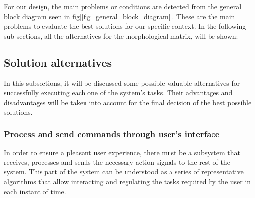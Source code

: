\documentclass[11pt]{report} %
\begin{document}
For our design, the main problems or conditions are detected from the general block diagram seen in fig[\ref{fig_general_block_diagram}]. These are the main problems to evaluate the best solutions for our specific context. In the following sub-sections, all the alternatives for the morphological matrix, will be shown:

\subsection{Solution alternatives}

In this subsections, it will be discussed some possible valuable alternatives for successfully executing each one of the system's tasks. Their advantages and disadvantages will be taken into account for the final decision of the best possible solutions.\\


\subsubsection{Process and send commands through user's interface}

In order to ensure a pleasant user experience, there must be a subsystem that receives, processes and sends the necessary action signals to the rest of the system. This part of the system can be understood as a series of representative  algorithms that allow interacting and regulating the tasks required by the user in each instant of time.
\end{document}
